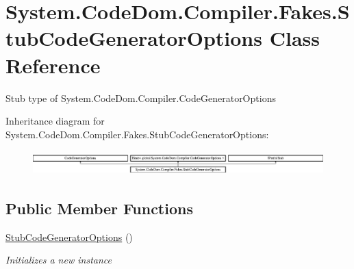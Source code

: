 \hypertarget{class_system_1_1_code_dom_1_1_compiler_1_1_fakes_1_1_stub_code_generator_options}{\section{System.\-Code\-Dom.\-Compiler.\-Fakes.\-Stub\-Code\-Generator\-Options Class Reference}
\label{class_system_1_1_code_dom_1_1_compiler_1_1_fakes_1_1_stub_code_generator_options}
}


Stub type of System.\-Code\-Dom.\-Compiler.\-Code\-Generator\-Options 


Inheritance diagram for System.\-Code\-Dom.\-Compiler.\-Fakes.\-Stub\-Code\-Generator\-Options\-:\begin{figure}[H]
\begin{center}
\leavevmode
\includegraphics[height=0.940386cm]{class_system_1_1_code_dom_1_1_compiler_1_1_fakes_1_1_stub_code_generator_options}
\end{center}
\end{figure}
\subsection*{Public Member Functions}
\begin{DoxyCompactItemize}
\item 
\hyperlink{class_system_1_1_code_dom_1_1_compiler_1_1_fakes_1_1_stub_code_generator_options_aa1e2fbbe4f1c62e4d7d82ce3f2ed3118}{Stub\-Code\-Generator\-Options} ()
\begin{DoxyCompactList}\small\item\em Initializes a new instance\end{DoxyCompactList}\end{DoxyCompactItemize}

